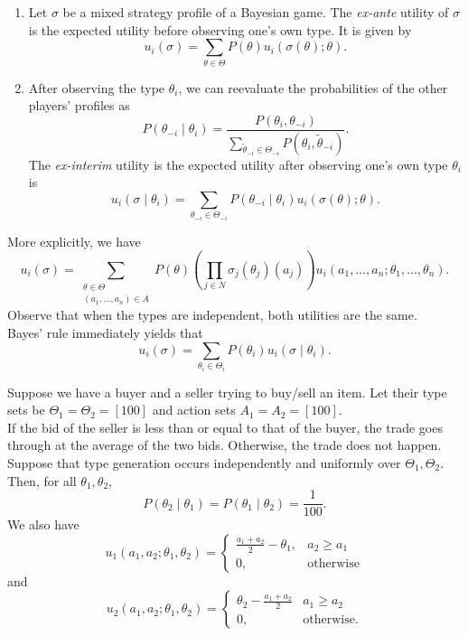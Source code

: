 	\begin{fdef}
		\phantom{pain}
		\begin{enumerate}
			\item Let $\sigma$ be a mixed strategy profile of a Bayesian game. The \emph{ex-ante} utility of $\sigma$ is the expected utility before observing one's own type. It is given by
			\[ u_i(\sigma) = \sum_{\theta \in \Theta} P(\theta) u_i(\sigma(\theta) ; \theta). \]
			\item After observing the type $\theta_i$, we can reevaluate the probabilities of the other players' profiles as
			\[ P(\theta_{-i} \mid \theta_i) = \frac{P(\theta_i,\theta_{-i})}{\sum_{\tilde{\theta}_{-i} \in \Theta_{-i}} P(\theta_i,\tilde{\theta}_{-i})}. \]
			The \emph{ex-interim} utility is the expected utility  after observing one's own type $\theta_i$ is
			\[ u_i(\sigma \mid \theta_i) = \sum_{\theta_{-i} \in \Theta_{-i}} P(\theta_{-i} \mid \theta_i) u_i(\sigma(\theta) ; \theta). \]
		\end{enumerate}
	\end{fdef}

	More explicitly, we have
	\[ u_i(\sigma) = \sum_{\substack{\theta \in \Theta \\ (a_1,\ldots,a_n) \in A}} P(\theta) \left(\prod_{j \in N} \sigma_j(\theta_j)(a_j)\right) u_i(a_1,\ldots,a_n ; \theta_1,\ldots,\theta_n). \]
	Observe that when the types are independent, both utilities are the same.\\

	Bayes' rule immediately yields that
	\[ u_i(\sigma) = \sum_{\theta_i \in \Theta_i} P(\theta_i) u_i(\sigma \mid \theta_i). \]

	\begin{fex}
		Suppose we have a buyer and a seller trying to buy/sell an item. Let their type sets be $\Theta_1 = \Theta_2 = [100]$ and action sets $A_1 = A_2 = [100]$.\\
		If the bid of the seller is less than or equal to that of the buyer, the trade goes through at the average of the two bids. Otherwise, the trade does not happen.\\
		Suppose that type generation occurs independently and uniformly over $\Theta_1,\Theta_2$. Then, for all $\theta_1,\theta_2$,
		\[ P(\theta_2 \mid \theta_1) = P(\theta_1 \mid \theta_2) = \frac{1}{100}. \]
		We also have
		\[ u_1(a_1,a_2;\theta_1,\theta_2) = \begin{cases} \frac{a_1+a_2}{2} - \theta_1, & a_2 \ge a_1 \\ 0, & \text{otherwise} \end{cases} \]
		and
		\[ u_2(a_1,a_2;\theta_1,\theta_2) = \begin{cases} \theta_2 - \frac{a_1+a_2}{2} & a_1 \ge a_2 \\ 0, & \text{otherwise.} \end{cases} \]
	\end{fex}



